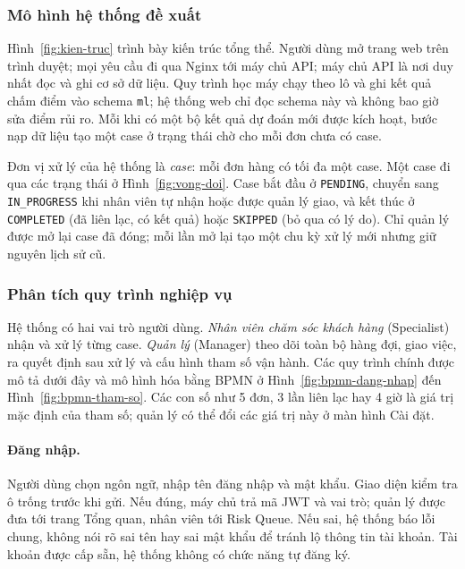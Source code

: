 \subsubsection{Mô hình hệ thống đề xuất}

Hình~\ref{fig:kien-truc} trình bày kiến trúc tổng thể. Người dùng mở trang web trên trình duyệt;
mọi yêu cầu đi qua Nginx tới máy chủ API; máy chủ API là nơi duy nhất đọc và ghi cơ sở dữ liệu.
Quy trình học máy chạy theo lô và ghi kết quả chấm điểm vào schema \texttt{ml}; hệ thống web chỉ
đọc schema này và không bao giờ sửa điểm rủi ro. Mỗi khi có một bộ kết quả dự đoán mới được kích
hoạt, bước nạp dữ liệu tạo một case ở trạng thái chờ cho mỗi đơn chưa có case.


Đơn vị xử lý của hệ thống là \textit{case}: mỗi đơn hàng có tối đa một case. Một case đi qua các
trạng thái ở Hình~\ref{fig:vong-doi}. Case bắt đầu ở \texttt{PENDING}, chuyển sang
\texttt{IN\_PROGRESS} khi nhân viên tự nhận hoặc được quản lý giao, và kết thúc ở
\texttt{COMPLETED} (đã liên lạc, có kết quả) hoặc \texttt{SKIPPED} (bỏ qua có lý do). Chỉ quản lý
được mở lại case đã đóng; mỗi lần mở lại tạo một chu kỳ xử lý mới nhưng giữ nguyên lịch sử cũ.


\subsubsection{Phân tích quy trình nghiệp vụ}

Hệ thống có hai vai trò người dùng. \textit{Nhân viên chăm sóc khách hàng} (Specialist) nhận và xử
lý từng case. \textit{Quản lý} (Manager) theo dõi toàn bộ hàng đợi, giao việc, ra quyết định sau xử
lý và cấu hình tham số vận hành. Các quy trình chính được mô tả dưới đây và mô hình hóa bằng BPMN ở
Hình~\ref{fig:bpmn-dang-nhap} đến Hình~\ref{fig:bpmn-tham-so}. Các con số như 5 đơn, 3 lần liên lạc
hay 4 giờ là giá trị mặc định của tham số; quản lý có thể đổi các giá trị này ở màn hình Cài đặt.

\paragraph{Đăng nhập.} Người dùng chọn ngôn ngữ, nhập tên đăng nhập và mật khẩu. Giao diện kiểm tra
ô trống trước khi gửi. Nếu đúng, máy chủ trả mã JWT và vai trò; quản lý được đưa tới trang Tổng quan,
nhân viên tới Risk Queue. Nếu sai, hệ thống báo lỗi chung, không nói rõ sai tên hay sai mật khẩu để
tránh lộ thông tin tài khoản. Tài khoản được cấp sẵn, hệ thống không có chức năng tự đăng ký.

